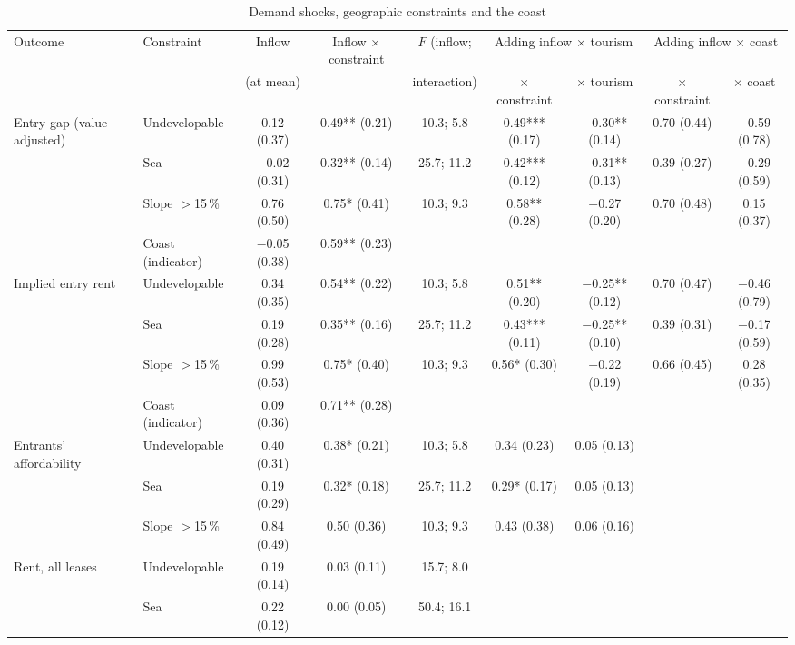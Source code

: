 \begin{table}[!htbp]\centering\small
\caption{Demand shocks, geographic constraints and the coast}\label{tab:rigidity}
\begin{adjustbox}{max width=\linewidth}\begin{tabular}{llccccccc}\toprule
Outcome & Constraint & Inflow & Inflow $\times$ constraint & $F$ (inflow; & \multicolumn{2}{c}{Adding inflow $\times$ tourism} & \multicolumn{2}{c}{Adding inflow $\times$ coast}\\\cmidrule(lr){6-7}\cmidrule(lr){8-9}
 & & (at mean) & & interaction) & $\times$ constraint & $\times$ tourism & $\times$ constraint & $\times$ coast\\\midrule
Entry gap (value-adjusted) & Undevelopable & 0.12 (0.37) & 0.49** (0.21) & 10.3; 5.8 & 0.49*** (0.17) & $-$0.30** (0.14) & 0.70 (0.44) & $-$0.59 (0.78)\\
 & Sea & $-$0.02 (0.31) & 0.32** (0.14) & 25.7; 11.2 & 0.42*** (0.12) & $-$0.31** (0.13) & 0.39 (0.27) & $-$0.29 (0.59)\\
 & Slope $>$15\,\% & 0.76 (0.50) & 0.75* (0.41) & 10.3; 9.3 & 0.58** (0.28) & $-$0.27 (0.20) & 0.70 (0.48) & 0.15 (0.37)\\
 & Coast (indicator) & $-$0.05 (0.38) & 0.59** (0.23) & & & & & \\
\addlinespace
Implied entry rent & Undevelopable & 0.34 (0.35) & 0.54** (0.22) & 10.3; 5.8 & 0.51** (0.20) & $-$0.25** (0.12) & 0.70 (0.47) & $-$0.46 (0.79)\\
 & Sea & 0.19 (0.28) & 0.35** (0.16) & 25.7; 11.2 & 0.43*** (0.11) & $-$0.25** (0.10) & 0.39 (0.31) & $-$0.17 (0.59)\\
 & Slope $>$15\,\% & 0.99 (0.53) & 0.75* (0.40) & 10.3; 9.3 & 0.56* (0.30) & $-$0.22 (0.19) & 0.66 (0.45) & 0.28 (0.35)\\
 & Coast (indicator) & 0.09 (0.36) & 0.71** (0.28) & & & & & \\
\addlinespace
Entrants' affordability & Undevelopable & 0.40 (0.31) & 0.38* (0.21) & 10.3; 5.8 & 0.34 (0.23) & 0.05 (0.13) & & \\
 & Sea & 0.19 (0.29) & 0.32* (0.18) & 25.7; 11.2 & 0.29* (0.17) & 0.05 (0.13) & & \\
 & Slope $>$15\,\% & 0.84 (0.49) & 0.50 (0.36) & 10.3; 9.3 & 0.43 (0.38) & 0.06 (0.16) & & \\
\addlinespace
Rent, all leases & Undevelopable & 0.19 (0.14) & 0.03 (0.11) & 15.7; 8.0 & &  & & \\
 & Sea & 0.22 (0.12) & 0.00 (0.05) & 50.4; 16.1 & &  & & \\

\end{tabular}
\end{adjustbox}
\end{table}
